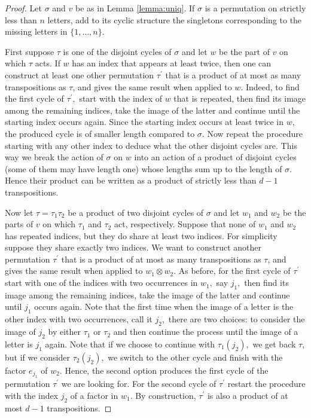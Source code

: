 \documentclass[12pt,dvipsnames,accepted=2016-08-18,a4paper,onecolumn]{quantumarticle}
\numberwithin{equation}{section}
\theoremstyle{definition}
\begin{document}
\begin{proof}
	Let $\sigma$ and $v$ be as in Lemma \ref{lemma:uniq}. If $\sigma$ is a permutation on strictly less than $n$ letters, add to its cyclic structure the singletons corresponding to the missing letters in $\{1,\ldots,n\}.$
	
	
	First suppose $\tau$ is one of the disjoint cycles of $\sigma$ and let $w$ be the part of $v$ on which $\tau$ acts. 
	If $w$ has an index that appears at least twice, then one can construct at least one other permutation $\tau^\prime$ that is a product of at most as many transpositions as $\tau$, and gives the same result when applied to $w.$ Indeed, to find the first cycle of $\tau^\prime,$ start with the index of $w$ that is repeated, then find its image among the remaining indices, take the image of the latter and continue until the starting index occurs again. Since the starting index occurs at least twice in $w,$ the produced cycle is of smaller length compared to $\sigma.$ Now repeat the procedure starting with any other index to deduce what the other disjoint cycles are. This way we break the action of $\sigma$ on $w$ into an action of a product of disjoint cycles (some of them may have length one) whose lengths sum up to the length of $\sigma.$ Hence their product can be written as a product
	of strictly less than $d-1$ transpositions.
	
	Now let $\tau = \tau_1 \tau_2$ be a product of two disjoint cycles of $\sigma$ and let  $w_1$ and $w_2$ be the parts of $v$ on which $\tau_1$ and $\tau_2$ act, respectively. Suppose that none of $w_1$ and $w_2$ has repeated indices, but they do share at least two indices. For simplicity suppose they share exactly two indices. We want to construct another permutation $\tau^\prime$ that is a product of at most as many transpositions as $\tau$, and gives the same result when applied to $w_1\otimes w_2.$ As before, for the first cycle of $\tau^\prime$ start with one of the indices with two occurrences in $w_1,$ say $j_1,$ then find its image among the remaining indices, take the image of the latter and continue until $j_1$ occurs again. Note that the first time when the image of a letter is the other index with two occurrences, call it $j_2,$ there are two choices: to consider the image of $j_2$ by either $\tau_1$ or $\tau_2$ and then continue the process until the image of a letter is $j_1$ again. Note that if we choose to continue with $\tau_1(j_2),$ we get back $\tau,$ but if we consider
	$\tau_2(j_2),$ we switch to the other cycle and finish with the factor $e_{j_1}$ of $w_2.$ Hence, the second option produces the first cycle of the permutation $\tau^\prime$ we are looking for. For the second cycle of $\tau^\prime$ restart the procedure with the index $j_2$ of a factor in $w_1.$ By construction, $\tau^\prime$ is also a product of at most $d-1$ transpositions.


\end{proof}
\end{document}
